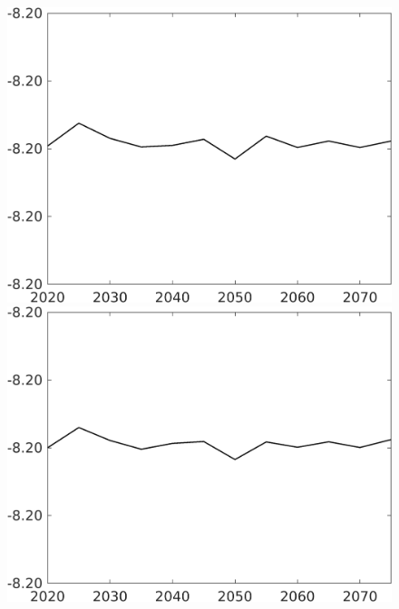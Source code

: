 \documentclass[12pt]{article}
\begin{document}
\begin{figure}
\begin{minipage}[]{0.32\textwidth}
\end{minipage}	
\begin{minipage}[]{0.32\textwidth}
\includegraphics[width=1\textwidth]{../../codding_model/own_basedOnFried/optimalPol_010922_revision/figures/all_13Sept22/CompTaul_Equlab_LFBAUPer_Reg0_wsf_spillover0_nsk1_xgr0_knspil1_sep1_countec0_GovRev0_etaa0.79.png}
\end{minipage}	
\begin{minipage}[]{0.32\textwidth}
\includegraphics[width=1\textwidth]{../../codding_model/own_basedOnFried/optimalPol_010922_revision/figures/all_13Sept22/CompTaul_Equlab_LFBAUPer_Reg0_wsg_spillover0_nsk1_xgr0_knspil1_sep1_countec0_GovRev0_etaa0.79.png}

\end{minipage}
\end{figure}
\end{document}
